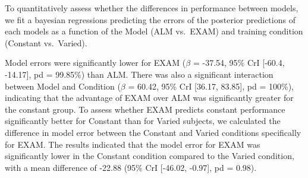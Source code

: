 \documentclass[
  12pt,
  letterpaper,
]{article}
\begin{document}
\begin{figure}


\caption{\label{fig-ee-e1}}

\end{figure}%

To quantitatively assess whether the differences in performance between
models, we fit a bayesian regressions predicting the errors of the
posterior predictions of each models as a function of the Model (ALM
vs.~EXAM) and training condition (Constant vs.~Varied).

Model errors were significantly lower for EXAM (\(\beta\) = -37.54, 95\%
CrI {[}-60.4, -14.17{]}, pd = 99.85\%) than ALM. There was also a
significant interaction between Model and Condition (\(\beta\) = 60.42,
95\% CrI {[}36.17, 83.85{]}, pd = 100\%), indicating that the advantage
of EXAM over ALM was significantly greater for the constant group. To
assess whether EXAM predicts constant performance significantly better
for Constant than for Varied subjects, we calculated the difference in
model error between the Constant and Varied conditions specifically for
EXAM. The results indicated that the model error for EXAM was
significantly lower in the Constant condition compared to the Varied
condition, with a mean difference of -22.88 (95\% CrI {[}-46.02,
-0.97{]}, pd = 0.98).
\end{document}
